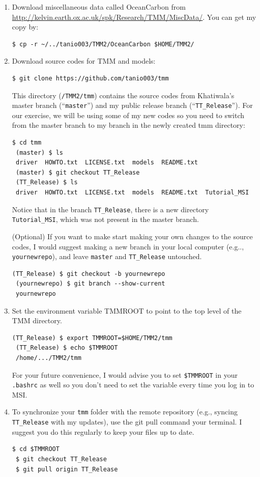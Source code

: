 \documentclass[a4paper]{article}
\begin{document}
\begin{enumerate}
\item Download miscellaneous data called OceanCarbon from \\ 
\url{http://kelvin.earth.ox.ac.uk/spk/Research/TMM/MiscData/}. You can get my copy by:
\begin{lstlisting}[style=DOS]
 $ cp -r ~/../tanio003/TMM2/OceanCarbon $HOME/TMM2/
\end{lstlisting}
\item Download source codes for TMM and models:
\begin{lstlisting}[style=DOS]
 $ git clone https://github.com/tanio003/tmm
\end{lstlisting}
 This directory (\verb|/TMM2/tmm|) contains the source codes from Khatiwala's master branch (``\verb|master|'') and my public release branch (``\verb|TT_Release|''). For our exercise, we will be using some of my new codes so you need to switch from the master branch to my branch in the newly created tmm directory:
\begin{lstlisting}[style=DOS]
 $ cd tmm
 (master) $ ls
 driver  HOWTO.txt  LICENSE.txt  models  README.txt
 (master) $ git checkout TT_Release
 (TT_Release) $ ls
 driver  HOWTO.txt  LICENSE.txt  models  README.txt  Tutorial_MSI
\end{lstlisting}
Notice that in the branch \verb|TT_Release|, there is a new directory \verb|Tutorial_MSI|, which was not present in the master branch. 

(Optional) If you want to make start making your own changes to the source codes, I would suggest making a new branch in your local computer (e.g.., \verb|yournewrepo|), and leave \verb|master| and \verb|TT_Release| untouched.
\begin{lstlisting}[style=DOS]
 (TT_Release) $ git checkout -b yournewrepo
 (yournewrepo) $ git branch --show-current
 yournewrepo
\end{lstlisting}
\item Set the environment variable TMMROOT to point to the top level of the TMM directory.
\begin{lstlisting}[style=DOS]
 (TT_Release) $ export TMMROOT=$HOME/TMM2/tmm
 (TT_Release) $ echo $TMMROOT
 /home/.../TMM2/tmm
\end{lstlisting}

For your future convenience, I would advise you to set \verb|$TMMROOT| in your \verb|.bashrc| as well so you don't need to set the variable every time you log in to MSI. 

\item To synchronize your \verb|tmm| folder with the remote repository (e.g., syncing \verb|TT_Release| with my updates), use the git pull command your terminal. I suggest you do this regularly to keep your files up to date.
\begin{lstlisting}[style=DOS]
 $ cd $TMMROOT
 $ git checkout TT_Release
 $ git pull origin TT_Release
\end{lstlisting}

\end{enumerate}
\end{document}
